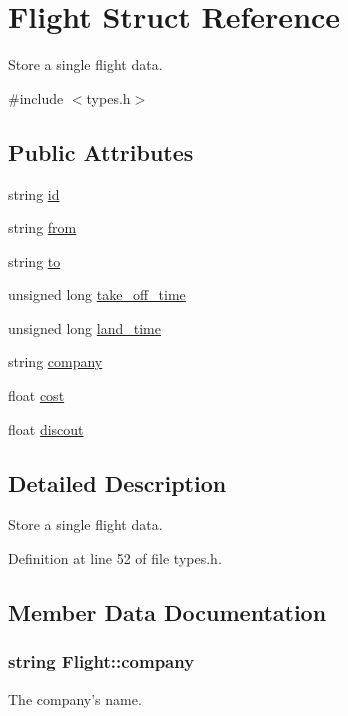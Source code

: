 \hypertarget{struct_flight}{\section{Flight Struct Reference}
\label{struct_flight}
}


Store a single flight data.  




{\ttfamily \#include $<$types.\-h$>$}

\subsection*{Public Attributes}
\begin{DoxyCompactItemize}
\item 
string \hyperlink{struct_flight_a3bbf0e0f8011e218386b569f98efb0eb}{id}
\item 
string \hyperlink{struct_flight_a2eebc4a79282532468b4668141b09acc}{from}
\item 
string \hyperlink{struct_flight_a77340455d173748e164aafdcd00c5638}{to}
\item 
unsigned long \hyperlink{struct_flight_ab5b6f34a342282ce5821c5490a0294c2}{take\-\_\-off\-\_\-time}
\item 
unsigned long \hyperlink{struct_flight_a8595c2a4dbdb6b5c4f391bd46aae2109}{land\-\_\-time}
\item 
string \hyperlink{struct_flight_a8bd600ffc5651751e220e96085e32671}{company}
\item 
float \hyperlink{struct_flight_a8906da621927c577acc9e423081c2bfa}{cost}
\item 
float \hyperlink{struct_flight_ae1412fea1196cc04d5ec761c135ec5a3}{discout}
\end{DoxyCompactItemize}


\subsection{Detailed Description}
Store a single flight data. 

Definition at line 52 of file types.\-h.



\subsection{Member Data Documentation}
\hypertarget{struct_flight_a8bd600ffc5651751e220e96085e32671}{
\subsubsection[{company}]{\setlength{\rightskip}{0pt plus 5cm}string Flight\-::company}}\label{struct_flight_a8bd600ffc5651751e220e96085e32671}
The company's name. 

